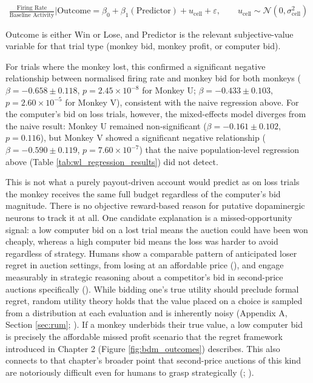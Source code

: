\begin{align}
\frac{\text{Firing Rate}}{\text{Baseline Activity}} \Big| \text{Outcome} = \beta_0 + \beta_1(\text{Predictor}) + u_{\text{cell}} + \varepsilon, \qquad u_{\text{cell}} \sim \mathcal{N}(0, \sigma^2_{\text{cell}}) \label{eq:lme_winlose}
\end{align}

Outcome is either Win or Lose, and Predictor is the relevant subjective-value variable for that trial type (monkey bid, monkey profit, or computer bid).

For trials where the monkey lost, this confirmed a significant negative relationship between normalised firing rate and monkey bid for both monkeys ($\beta = -0.658 \pm 0.118$, $p = 2.45 \times 10^{-8}$ for Monkey U; $\beta = -0.433 \pm 0.103$, $p = 2.60 \times 10^{-5}$ for Monkey V), consistent with the naive regression above. For the computer's bid on loss trials, however, the mixed-effects model diverges from the naive result: Monkey U remained non-significant ($\beta = -0.161 \pm 0.102$, $p = 0.116$), but Monkey V showed a significant negative relationship ($\beta = -0.590 \pm 0.119$, $p = 7.60 \times 10^{-7}$) that the naive population-level regression above (Table \ref{tab:wl_regression_results}) did not detect.

This is not what a purely payout-driven account would predict as on loss trials the monkey receives the same full budget regardless of the computer's bid magnitude. There is no objective reward-based reason for putative dopaminergic neurons to track it at all. One candidate explanation is a missed-opportunity signal: a low computer bid on a lost trial means the auction could have been won cheaply, whereas a high computer bid means the loss was harder to avoid regardless of strategy. Humans show a comparable pattern of anticipated loser regret in auction settings, from losing at an affordable price (\cite{filiz-ozbayAuctionsAnticipatedRegret2007}), and engage measurably in strategic reasoning about a competitor's bid in second-price auctions specifically (\cite{gretherMentalProcessesStrategic2007}). While bidding one's true utility should preclude formal regret, random utility theory holds that the value placed on a choice is sampled from a distribution at each evaluation and is inherently noisy (Appendix A, Section \ref{sec:rum}; \cite{mcfaddenEconometricModelsProbabilistic1982}). If a monkey underbids their true value, a low computer bid is precisely the affordable missed profit scenario that the regret framework introduced in Chapter 2 (Figure \ref{fig:bdm_outcomes}) describes. This also connects to that chapter's broader point that second-price auctions of this kind are notoriously difficult even for humans to grasp strategically (\cite{casonMisconceptionsGameForm2014}; \cite{hamukwalaDesignFactorsInfluencing2019}).

